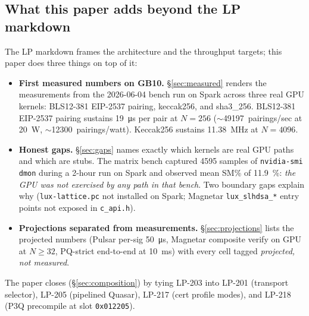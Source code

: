\subsection{What this paper adds beyond the LP markdown}

The LP markdown frames the architecture and the throughput
targets; this paper does three things on top of it:

\begin{itemize}[leftmargin=2em,nosep]
\item \textbf{First measured numbers on GB10.}
  \S\ref{sec:measured} renders the measurements from the
  2026-06-04 bench run on Spark across three real GPU kernels:
  BLS12-381 EIP-2537 pairing, keccak256, and sha3\_256.
  BLS12-381 EIP-2537 pairing sustains \SI{19}{\micro\second} per
  pair at $N{=}256$ ($\sim$\num{49197}~pairings/sec at
  \SI{20}{\watt}, $\sim$\num{12300}~pairings/watt). Keccak256
  sustains \SI{11.38}{\mega\hertz} at $N{=}4096$.
\item \textbf{Honest gaps.} \S\ref{sec:gaps} names exactly which
  kernels are real GPU paths and which are stubs. The matrix
  bench captured \num{4595} samples of \texttt{nvidia-smi dmon}
  during a 2-hour run on Spark and observed mean SM\% of
  \SI{11.9}{\percent}: \emph{the GPU was not exercised by any
  path in that bench}. Two boundary gaps explain why
  (\texttt{lux-lattice.pc} not installed on Spark; Magnetar
  \texttt{lux\_slhdsa\_*} entry points not exposed in
  \texttt{c\_api.h}).
\item \textbf{Projections separated from measurements.}
  \S\ref{sec:projections} lists the projected numbers (Pulsar
  per-sig \SI{50}{\micro\second}, Magnetar composite verify on
  GPU at $N\geq 32$, PQ-strict end-to-end at \SI{10}{\milli\second})
  with every cell tagged \emph{projected, not measured}.
\end{itemize}

The paper closes (\S\ref{sec:composition}) by tying LP-203 into
LP-201 (transport selector), LP-205 (pipelined Quasar), LP-217
(cert profile modes), and LP-218 (P3Q precompile at slot
\texttt{0x012205}).
